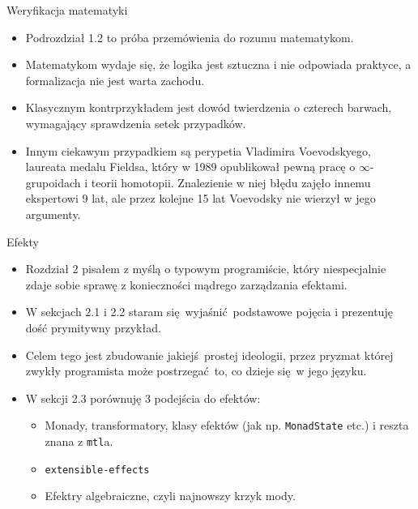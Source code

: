 \documentclass{beamer}
\begin{document}
\begin{frame}{Weryfikacja matematyki}
\begin{itemize}
	\item Podrozdział 1.2 to próba przemówienia do rozumu matematykom.
	\item Matematykom wydaje się, że logika jest sztuczna i nie odpowiada praktyce, a formalizacja nie jest warta zachodu.
	\item Klasycznym kontrprzykładem jest dowód twierdzenia o czterech barwach, wymagający sprawdzenia setek przypadków.
	\item Innym ciekawym przypadkiem są perypetia Vladimira Voevodskyego, laureata medalu Fieldsa, który w 1989 opublikował pewną pracę o $\infty$-grupoidach i teorii homotopii. Znalezienie w niej błędu zajęło innemu ekspertowi 9 lat, ale przez kolejne 15 lat Voevodsky nie wierzył w jego argumenty.
\end{itemize}
\end{frame}

\begin{frame}{Efekty}
\begin{itemize}
	\item Rozdział 2 pisałem z myślą o typowym programiście, który niespecjalnie zdaje sobie sprawę z konieczności mądrego zarządzania efektami.
	\item W sekcjach 2.1 i 2.2 staram się wyjaśnić podstawowe pojęcia i prezentuję dość prymitywny przykład.
	\item Celem tego jest zbudowanie jakiejś prostej ideologii, przez pryzmat której zwykły programista może postrzegać to, co dzieje się w jego języku.
	\item W sekcji 2.3 porównuję 3 podejścia do efektów:
	\begin{itemize}
		\item Monady, transformatory, klasy efektów (jak np. \texttt{MonadState} etc.) i reszta znana z \texttt{mtl}a.
		\item \texttt{extensible-effects}
		\item Efektry algebraiczne, czyli najnowszy krzyk mody.
	\end{itemize}
\end{itemize}
\end{frame}
\end{document}
